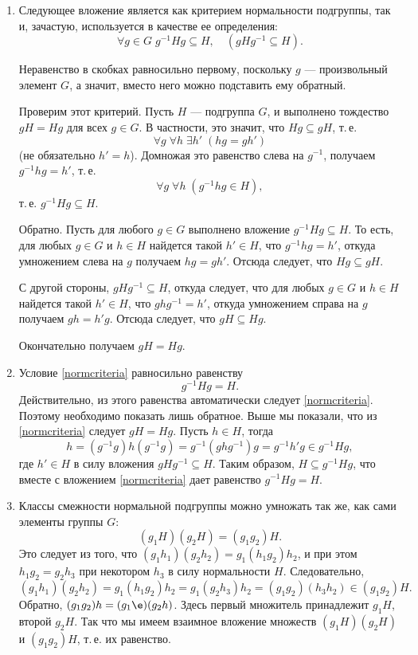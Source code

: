 \begin{enumerate}
\item Следующее вложение является как критерием нормальности подгруппы, так и, зачастую, используется в качестве ее определения:
\begin{equation}\label{normcriteria}
\forall g\in G\;g^{-1}Hg\subseteq H,\quad (gHg^{-1}\subseteq H).
\end{equation}

Неравенство в скобках равносильно первому, поскольку $g$ --- произвольный элемент $G$, а значит, вместо него можно подставить ему обратный.

Проверим этот критерий. Пусть $H$ --- подгруппа $G$, и выполнено тождество $gH=Hg$ для всех $g\in G$. В частности, это значит, что $Hg\subseteq gH$, т.\,е.
$$
\forall g\;\forall h\;\exists h'\;(hg=gh')
$$
(не обязательно $h'=h$). Домножая это равенство слева на $g^{-1}$, получаем $g^{-1}hg=h'$, т.\,е.
$$
\forall g\;\forall h\;(g^{-1}hg\in H),
$$
т.\,е. $g^{-1}Hg\subseteq H$.

Обратно. Пусть для любого $g\in G$ выполнено вложение $g^{-1}Hg\subseteq H$. То есть, для любых $g\in G$ и $h\in H$ найдется такой $h'\in H$, что $g^{-1}hg=h'$, откуда умножением слева на $g$ получаем $hg=gh'$. Отсюда следует, что $Hg\subseteq gH$.

С другой стороны, $gHg^{-1}\subseteq H$, откуда следует, что для любых $g\in G$ и $h\in H$ найдется такой $h'\in H$, что $ghg^{-1}=h'$, откуда умножением справа на $g$ получаем $gh=h'g$. Отсюда следует, что $gH\subseteq Hg$. 

Окончательно получаем $gH=Hg$.

\item Условие \eqref{normcriteria} равносильно равенству
$$
g^{-1}Hg=H.
$$
Действительно, из этого равенства автоматически следует \eqref{normcriteria}. Поэтому необходимо показать лишь обратное. Выше мы показали, что из \eqref{normcriteria} следует $gH=Hg$. Пусть $h\in H$, тогда
$$
h=(g^{-1}g)h(g^{-1}g)=g^{-1}(ghg^{-1})g=g^{-1}h'g\in g^{-1}Hg,
$$
где $h'\in H$ в силу вложения $gHg^{-1}\subseteq H$. Таким образом, $H\subseteq g^{-1}Hg$, что вместе с вложением \eqref{normcriteria} дает равенство $g^{-1}Hg=H$.


\item Классы смежности нормальной подгруппы можно умножать так же, как сами элементы группы $G$:
\begin{equation}\label{classprod}
(g_1H)(g_2H)=(g_1g_2)H.
\end{equation}
Это следует из того, что $(g_1h_1)(g_2h_2)=g_1(h_1g_2)h_2$, и при этом $h_1g_2=g_2h_3$ при некотором $h_3$ в силу нормальности $H$. Следовательно,
$$
(g_1h_1)(g_2h_2) = g_1(h_1g_2)h_2 = g_1(g_2h_3)h_2=(g_1g_2)(h_3h_2)\in (g_1g_2)H.
$$
Обратно, $(g_1g_2)h=(g_1\e)(g_2h)$. Здесь первый множитель принадлежит $g_1H$, второй $g_2H$. Так что мы имеем взаимное вложение множеств $(g_1H)(g_2H)$ и $(g_1g_2)H$, т.\,е. их равенство.


\end{enumerate}
